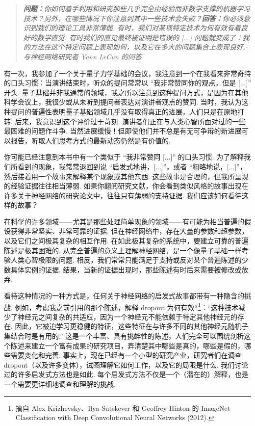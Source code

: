 \begin{quote}
\emph{\textbf{问题：}你如何着手利用和研究那些几乎完全由经验而非数学支撑的机器学习技术？另外，在哪些情况下你注意到其中一些技术会失败？\textbf{回答：}你必须意识到我们的理论工具非常薄弱. 有时，我们对某项特定技术为何有效有着良好的数学直觉. 有时我们的直觉最终被证明是错误的 [...] 问题就变成了：我的方法在这个特定问题上表现如何，以及它在多大的问题集合上表现良好.- 与神经网络研究者 Yann LeCun 的问答}
\end{quote}

有一次，我参加了一个关于量子力学基础的会议，我注意到一个在我看来非常奇特的口头习惯：当演讲结束时，听众的提问常常以 ``我非常赞同你的观点，但是 [...]'' 开头. 量子基础并非我通常的领域，我之所以注意到这种提问方式，是因为在其他科学会议上，我很少或从未听到提问者表达对演讲者观点的赞同. 当时，我认为这种提问的普遍性表明量子基础领域几乎没有取得真正的进展，人们只是在原地打转. 后来，我意识到这个评价过于苛刻. 演讲者们正在与人类心智所面对过的一些最困难的问题作斗争. 当然进展缓慢！但即使他们并不总是有无可争辩的新进展可以报告，听取人们思考方式的最新动态仍然是有价值的.

你可能已经注意到本书中有一个类似于 ``我非常赞同 [...]'' 的口头习惯. 为了解释我们所看到的现象，我常常退回到说 ``启发式地讲，[...]''，或者 ``粗略地说，[...]''，然后接着用一个故事来解释某个现象或其他东西. 这些故事是合理的，但我所呈现的经验证据往往相当薄弱. 如果你翻阅研究文献，你会看到类似风格的故事出现在许多关于神经网络的研究论文中，往往只有薄弱的支持证据. 我们应该如何看待这样的故事？

在科学的许多领域——尤其是那些处理简单现象的领域——有可能为相当普遍的假设获得非常坚实、非常可靠的证据. 但在神经网络中，存在大量的参数和超参数，以及它们之间极其复杂的相互作用. 在如此极其复杂的系统中，要建立可靠的普遍陈述是极其困难的. 从完全普遍的意义上理解神经网络，是一个像量子基础一样考验人类心智极限的问题. 相反，我们常常只能满足于支持或反对某个普遍陈述的少数具体实例的证据. 结果，当新的证据出现时，那些陈述有时后来需要被修改或放弃.

看待这种情况的一种方式是，任何关于神经网络的启发式故事都带有一种隐含的挑战. 例如，考虑我之前引用的那个陈述，解释 dropout 为何有效*\footnote{摘自 Alex Krizhevsky、Ilya Sutskever 和 Geoffrey Hinton 的 ImageNet Classification with Deep Convolutional Neural Networks (2012).}：``这种技术减少了神经元之间复杂的共适应，因为一个神经元不能依赖于特定其他神经元的存在. 因此，它被迫学习更稳健的特征，这些特征在与许多不同的其他神经元随机子集结合时是有用的.'' 这是一个丰富、具有挑衅性的陈述，人们完全可以围绕剖析这个陈述来建立一个富有成果的研究项目，弄清楚其中哪些是真的，哪些是假的，哪些需要变化和完善. 事实上，现在已经有一个小型的研究产业，研究者们在调查 dropout（以及许多变体），试图理解它如何工作，以及它的局限是什么. 我们讨论过的许多启发式方法也是如此. 每个启发式方法不仅是一个（潜在的）解释，也是一个需要更详细地调查和理解的挑战.

